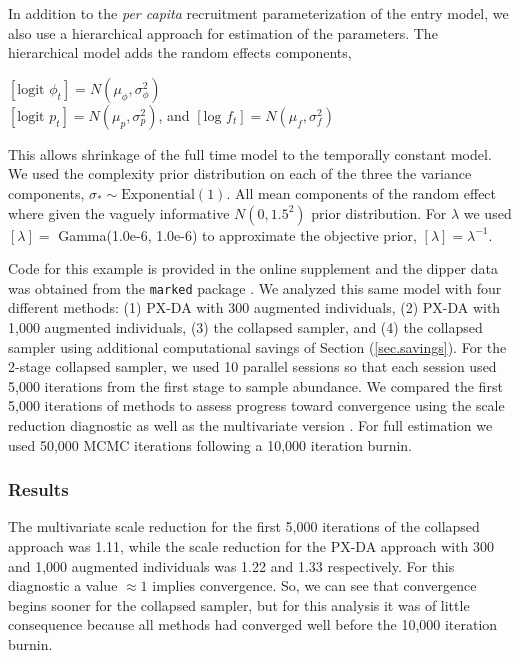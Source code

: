\documentclass[12pt]{article}
\begin{document}
In addition to the {\it per capita} recruitment parameterization of the entry model, we also use a hierarchical approach for estimation of the  parameters. The hierarchical model adds the random effects components,
\begin{center}
$[\text{logit } \phi_t] = N(\mu_\phi,\sigma_\phi^2)$ \\
$[\text{logit } p_t] = N(\mu_p,\sigma_p^2)$, and $[\text{log } f_t] = N(\mu_f,\sigma_f^2)$
\end{center}
This allows shrinkage of the full time model to the temporally constant model. We used the complexity prior distribution \citep{martins2017penalising} on each of the three the variance components, $\sigma_* \sim \text{Exponential}(1)$. All mean components of the random effect where given the vaguely informative $N(0,1.5^2)$ prior distribution. For $\lambda$ we used $[\lambda] =$ Gamma(1.0e-6, 1.0e-6) to approximate the objective prior, $[\lambda]=\lambda^{-1}$\citep{schofield2023estimating}.

Code for this example is provided in the online supplement and the dipper data was obtained from the {\tt marked} package \citep{Laake:2013aa}. We analyzed this same model with four different methods: (1) PX-DA with 300 augmented individuals, (2) PX-DA with 1,000 augmented individuals, (3) the collapsed sampler, and (4) the collapsed sampler using additional computational savings of Section (\ref{sec.savings}).  For the 2-stage collapsed sampler, we used 10 parallel sessions so that each session used 5,000 iterations from the first stage to sample abundance. We compared the first 5,000 iterations of methods to assess progress toward convergence using the scale reduction diagnostic \citep{GelmanRubin1992a} as well as the multivariate version \citep{BrooksGelman1998a}. For full estimation we used 50,000 MCMC iterations following a 10,000 iteration burnin. 

\subsubsection{Results}

The multivariate scale reduction for the first 5,000 iterations of the collapsed approach was 1.11, while the scale reduction for the PX-DA approach with 300 and 1,000 augmented individuals was 1.22 and 1.33 respectively. For this diagnostic a value $\approx 1$ implies convergence. So, we can see that convergence begins sooner for the collapsed sampler, but for this analysis it was of little consequence because all methods had converged well before the 10,000 iteration burnin.   
\end{document}
